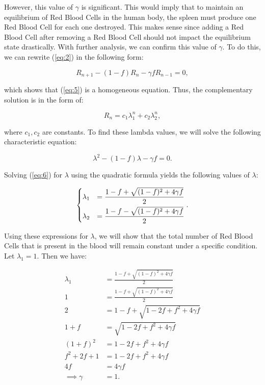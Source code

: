 However, this value of $\gamma$ is significant. This would imply that to maintain an equilibrium of Red Blood Cells in the human body, the spleen must produce one Red Blood Cell for each one destroyed. This makes sense since adding a Red Blood Cell after removing a Red Blood Cell should not impact the equilibrium state drastically. With further analysis, we can confirm this value of $\gamma$. To do this, we can rewrite (\ref{eq:2}) in the following form:

\begin{equation}
    R_{n+1} - (1-f)R_n - \gamma fR_{n-1} = 0, \label{eq:5}
\end{equation}

which shows that (\ref{eq:5}) is a homogeneous equation. Thus, the complementary solution is in the form of:

\[
R_n = c_1\lambda_1^n + c_2\lambda_2^n,
\]

where $c_1,c_2$ are constants. To find these lambda values, we will solve the following characteristic equation:

\begin{equation} \label{eq:6}
    \lambda^2 - (1 - f)\lambda - \gamma f = 0.
\end{equation}

Solving (\ref{eq:6}) for $\lambda$ using the quadratic formula yields the following values of $\lambda$:

\[
\begin{dcases}
\lambda_1 &= \frac{1-f + \sqrt{(1-f)^2 + 4\gamma f}}{2}\\
\lambda_2 &= \frac{1-f - \sqrt{(1-f)^2 + 4\gamma f}}{2}
\end{dcases}.
\]

Using these expressions for $\lambda$, we will show that the total number of Red Blood Cells that is present in the blood will remain constant under a specific condition. Let $\lambda_1=1$. Then we have:

\begin{align*}
    \lambda_1 &= \frac{1-f + \sqrt{(1-f)^2 + 4\gamma f}}{2}\\
    1 &= \frac{1-f + \sqrt{(1-f)^2 + 4\gamma f}}{2}\\
    2 &= 1-f + \sqrt{1 - 2f + f^2 + 4\gamma f}\\
    1 + f &= \sqrt{1 - 2f + f^2 + 4\gamma f}\\
    (1 + f)^2 &= 1 - 2f + f^2 + 4\gamma f\\
    f^2 + 2f + 1 &= 1 - 2f + f^2 + 4\gamma f\\
    4f &= 4\gamma f\\
    \implies\gamma &= 1.
\end{align*}


